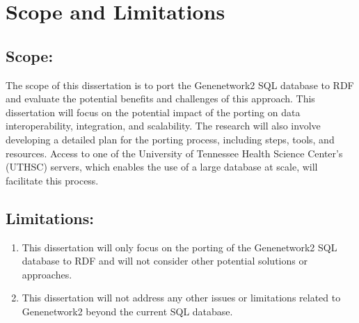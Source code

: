 \section{Scope and Limitations}
\subsection*{Scope:}

The scope of this dissertation is to port the Genenetwork2 SQL database to RDF and evaluate the potential benefits and challenges of this approach.  This dissertation will focus on the potential impact of the porting on data interoperability, integration, and scalability.  The research will also involve developing a detailed plan for the porting process, including steps, tools, and resources.  Access to one of the University of Tennessee Health Science Center's (UTHSC) servers, which enables the use of a large database at scale, will facilitate this process.

\subsection*{Limitations:}

\begin{enumerate}
\item This dissertation will only focus on the porting of the Genenetwork2 SQL database to RDF and will not consider other potential solutions or approaches.
\item This dissertation will not address any other issues or limitations related to Genenetwork2 beyond the current SQL database.
\end{enumerate}
